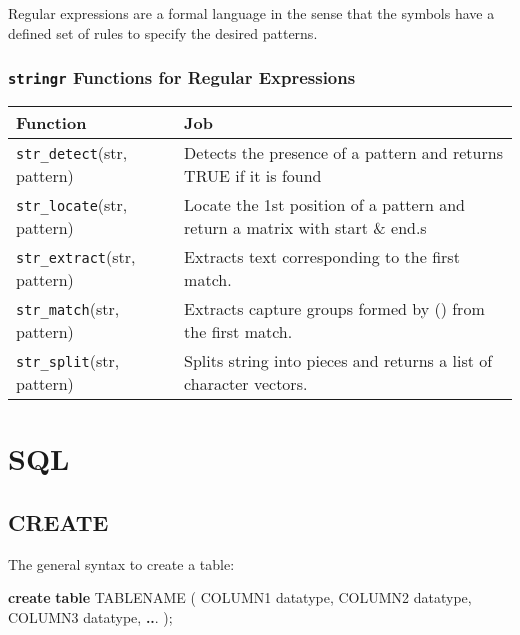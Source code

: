 \documentclass[
]{book}
\newenvironment{Shaded}{\begin{snugshade}}{\end{snugshade}}
\newcommand{\KeywordTok}[1]{\textcolor[rgb]{0.13,0.29,0.53}{\textbf{#1}}}
\newcommand{\NormalTok}[1]{#1}
\newcommand{\OperatorTok}[1]{\textcolor[rgb]{0.81,0.36,0.00}{\textbf{#1}}}
\begin{document}
Regular expressions are a formal language in the sense that the symbols have a defined set of rules to specify the desired patterns.

\hypertarget{stringr-functions-for-regular-expressions}{%
\subsection{\texorpdfstring{\texttt{stringr} Functions for Regular Expressions}{stringr Functions for Regular Expressions}}\label{stringr-functions-for-regular-expressions}}

\begin{longtable}[]{@{}
  >{\centering\arraybackslash}p{}
  >{\centering\arraybackslash}p{}@{}}
\toprule
Function & Job \\
\midrule
\endhead
\texttt{str\_detect}(str, pattern) & Detects the presence of a pattern and returns TRUE if it is found \\
\texttt{str\_locate}(str, pattern) & Locate the 1st position of a pattern and return a matrix with start \& end.s \\
\texttt{str\_extract}(str, pattern) & Extracts text corresponding to the first match. \\
\texttt{str\_match}(str, pattern) & Extracts capture groups formed by () from the first match. \\
\texttt{str\_split}(str, pattern) & Splits string into pieces and returns a list of character vectors. \\
\bottomrule
\end{longtable}

\hypertarget{sql}{%
\chapter{SQL}\label{sql}}

\hypertarget{create}{%
\section{CREATE}\label{create}}

The general syntax to create a table:

\begin{Shaded}
\begin{Highlighting}[]
\KeywordTok{create} \KeywordTok{table}\NormalTok{ TABLENAME (}
\NormalTok{  COLUMN1 datatype, }
\NormalTok{  COLUMN2 datatype, }
\NormalTok{  COLUMN3 datatype, }
  \OperatorTok{..}\NormalTok{. );}
\end{Highlighting}
\end{Shaded}
\end{document}

